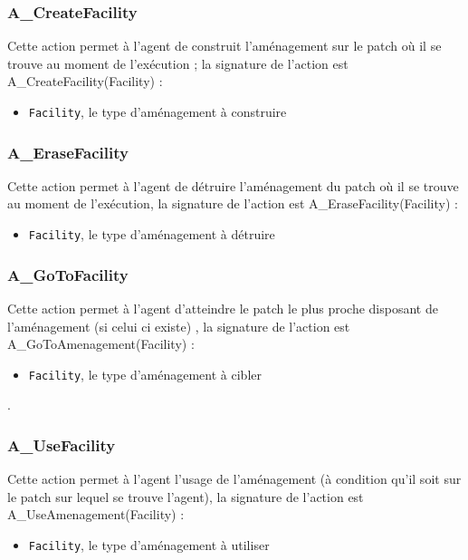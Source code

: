\subsubsection{A\_CreateFacility} 
	Cette action permet à l'agent de construit l'aménagement sur le patch où il se trouve au moment de l'exécution ; la signature de l'action est A\_CreateFacility(Facility) :

	\begin{itemize}
	\item \texttt{Facility}, le type d'aménagement à construire
	\end{itemize}
	
	
\subsubsection{A\_EraseFacility} 
Cette action permet à l'agent de détruire l'aménagement du  patch où il se trouve au moment de l'exécution, la signature de l'action est A\_EraseFacility(Facility) :

	\begin{itemize}
	\item \texttt{Facility}, le type d'aménagement à détruire
	\end{itemize}
	

\subsubsection{A\_GoToFacility} 
Cette action permet à l'agent d'atteindre le patch le plus proche disposant de l'aménagement (si celui ci existe) , la signature de l'action est A\_GoToAmenagement(Facility) :
	\begin{itemize}
	\item \texttt{Facility}, le type d'aménagement à cibler
	\end{itemize}
	
	.
	
\subsubsection{A\_UseFacility} 
Cette action permet à l'agent l'usage de l'aménagement (à condition qu'il soit sur le patch sur lequel se trouve l'agent), la signature de l'action est A\_UseAmenagement(Facility) :
	\begin{itemize}
	\item \texttt{Facility}, le type d'aménagement à utiliser
	\end{itemize}
	
	
	
